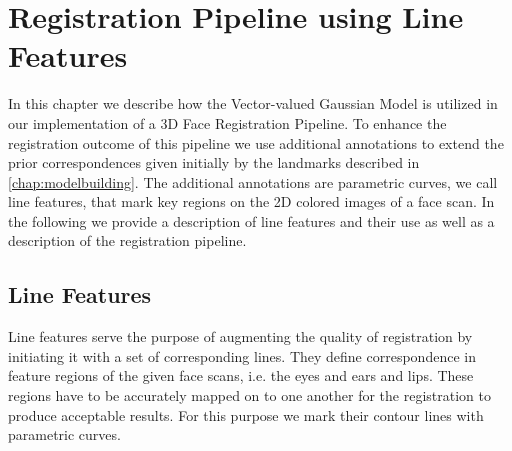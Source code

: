 \chapter{Registration Pipeline using Line Features}
\label{chap:pipelinefeatures}
In this chapter we describe how the Vector-valued Gaussian Model is utilized in our implementation of a 3D Face Registration Pipeline. To enhance the registration outcome of this pipeline we use additional annotations to extend the prior correspondences given initially by the landmarks described in \ref{chap:modelbuilding}. The additional annotations are parametric curves, we call line features, that mark key regions on the 2D colored images of a face scan. In the following we provide a description of line features and their use
as well as a description of the registration pipeline. 

\section{Line Features}
Line features serve the purpose of augmenting the quality of registration by initiating it with a set of corresponding lines. They define correspondence in feature regions of the given face scans, i.e. the eyes and ears and lips. These regions have to be accurately mapped on to one another for the registration to produce acceptable results. For this purpose we mark their contour lines with parametric curves. 

